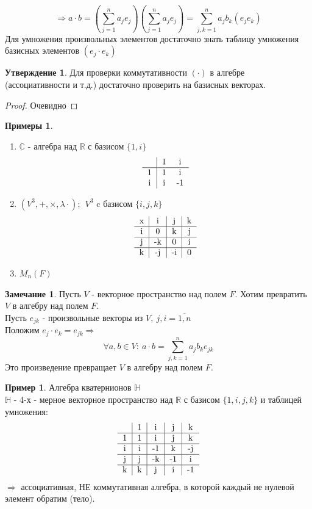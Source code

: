 \documentclass[a4paper, 12pt]{article}
\newcommand{\R}{\mathbb R}
\newcommand\tab[1][.5cm]{\hspace*{#1}}
\theoremstyle{definition}
\newtheorem*{subtheorem}{Утверждение}
\newtheorem*{remark}{Замечание}
\newtheorem*{example}{Примеры}
\newtheorem*{example1}{Пример}
\begin{document}
  $$\Longrightarrow a \cdot b = (\sum \limits_{j=1}^na_je_j)(\sum \limits_{j=1}^na_je_j) = \sum \limits_{j,k=1}^na_jb_k(e_je_k)$$ 
  Для умножения произвольных элементов достаточно знать таблицу умножения базисных элементов $(e_j \cdot e_k)$ 
  \begin{subtheorem}
    Для проверки коммутативности $(\cdot)$ в алгебре (ассоциативности и т.д.) достаточно проверить на базисных векторах. 
  \end{subtheorem} 
  \begin{proof}
    Очевидно
  \end{proof}
  \begin{example}\tab
    \begin{enumerate}
      \item $\mathbb{C}$ - алгебра над $\R$ с базисом $\{1, i\}$
      $$\begin{tabular}{c|cc}
        \null & 1 & i \\ \hline
        1 & 1 & i \\
        i & i & -1
      \end{tabular}$$
      \item $(V^3, +, \times, \lambda \cdot); \  \ V^3$ c базисом $\{i, j, k\}$
      $$\begin{tabular}{c|c|c|c}
        x & i & j & k \\ \hline
        i & 0 & k & j \\ \hline
        j & -k & 0 & i \\ \hline
        k & -j & -i & 0
      \end{tabular}$$
      \item $M_n(F)$
    \end{enumerate}
  \end{example}
  \begin{remark}
    Пусть $V$ - векторное пространство над полем $F$.
  Хотим превратить $V$ в алгебру над полем $F$. \\
  Пусть $e_{jk}$ - произвольные векторы из $V, \ j,i = \overline{1, n}$ \\
  Положим $e_j \cdot e_k = e_{jk} \Longrightarrow $ $$\forall a, b\in V: \ a\cdot b=\sum \limits_{j,k=1}^na_jb_ke_{jk}$$
  Это произведение превращает $V$ в алгебру над полем $F$.  
  \end{remark} 
  \begin{example1}
    Алгебра кватернионов $\mathbb{H}$ \\
    $\mathbb{H}$ - 4-х - мерное векторное пространство над $\R$ с базисом $\{1, i, j, k\}$ и таблицей умножения:
    $$\begin{tabular}{c|c|c|c|c}
        \null & 1 & i & j & k \\ \hline
        1 & 1 & i & j & k \\ \hline
        i & i & -1 & k & -j \\ \hline
        j & j & -k & -1 & i \\ \hline
        k & k & j & i & -1
      \end{tabular}$$
      $\Longrightarrow $ ассоциативная, НЕ коммутативная алгебра, в которой каждый не нулевой элемент обратим (тело).  
  \end{example1}
\end{document}
